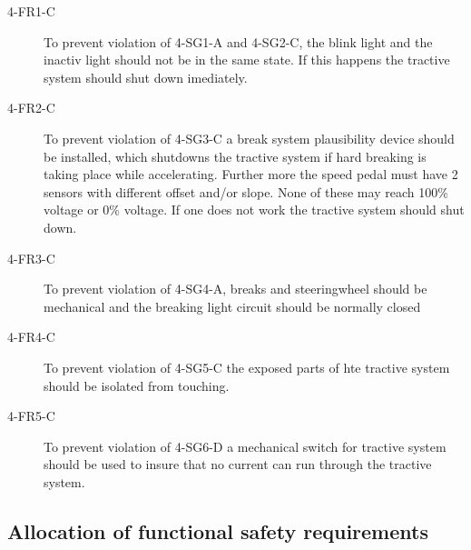 \begin{description}
\item [4-FR1-C] To prevent violation of 4-SG1-A and 4-SG2-C, the blink light and the inactiv light should not be in the same state. If this happens the tractive system should shut down imediately.

\item [4-FR2-C] To prevent violation of 4-SG3-C a break system plausibility device should be installed, which shutdowns the tractive system if hard breaking is taking place while accelerating. Further more the speed pedal must have 2 sensors with different offset and/or slope. None of these may reach 100\% voltage or 0\% voltage. If one does not work the tractive system should shut down.

\item [4-FR3-C] To prevent violation of 4-SG4-A, breaks and steeringwheel should be mechanical and the breaking light circuit should be normally closed

\item [4-FR4-C] To prevent violation of 4-SG5-C the exposed parts of hte tractive system should be isolated from touching.

\item [4-FR5-C] To prevent violation of 4-SG6-D a mechanical switch for tractive system should be used to insure that no current can run through the tractive system.


\end{description}


\subsection{Allocation of functional safety requirements}
%
% 
%
%
%
